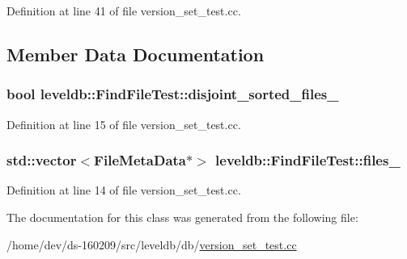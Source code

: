 Definition at line 41 of file version\+\_\+set\+\_\+test.\+cc.



\subsection{Member Data Documentation}
\hypertarget{classleveldb_1_1_find_file_test_acf50512be17b9a3cd96388a8c837b8e0}{}
\subsubsection[{disjoint\+\_\+sorted\+\_\+files\+\_\+}]{\setlength{\rightskip}{0pt plus 5cm}bool leveldb\+::\+Find\+File\+Test\+::disjoint\+\_\+sorted\+\_\+files\+\_\+}\label{classleveldb_1_1_find_file_test_acf50512be17b9a3cd96388a8c837b8e0}


Definition at line 15 of file version\+\_\+set\+\_\+test.\+cc.

\hypertarget{classleveldb_1_1_find_file_test_a53b61e6b01283c235fae219013b0e2c7}{}
\subsubsection[{files\+\_\+}]{\setlength{\rightskip}{0pt plus 5cm}std\+::vector$<${\bf File\+Meta\+Data}$\ast$$>$ leveldb\+::\+Find\+File\+Test\+::files\+\_\+}\label{classleveldb_1_1_find_file_test_a53b61e6b01283c235fae219013b0e2c7}


Definition at line 14 of file version\+\_\+set\+\_\+test.\+cc.



The documentation for this class was generated from the following file\+:\begin{DoxyCompactItemize}
\item 
/home/dev/ds-\/160209/src/leveldb/db/\hyperlink{version__set__test_8cc}{version\+\_\+set\+\_\+test.\+cc}\end{DoxyCompactItemize}
